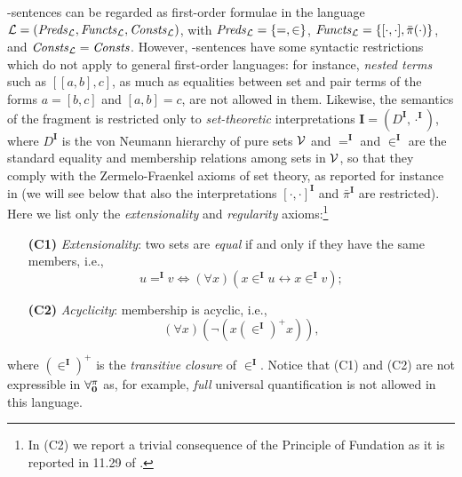 \documentclass[manyauthors]{fundam}
\newcommand{\Lang}{\ensuremath{\mathcal{L}\xspace}} %
\newcommand{\LangPreds}{\Preds_{\Lang}}
\newcommand{\LangFuncts}{\Functs_{\Lang}}
\newcommand{\LangConsts}{\Consts_{\Lang}}
\newcommand{\nonpairssym}{\bar{\pi}}
\newcommand{\nonpairs}[1]{\nonpairssym(#1)}
\newcommand{\inter}{\ensuremath{\mathbf{I}}\xspace}
\begin{document}
\Forallpizero-sentences can be regarded as first-order
formulae in the language $\Lang=(\LangPreds, \LangFuncts, \LangConsts)$, with
$\LangPreds=\{ = ,\in \}$, $\LangFuncts=\{ [\cdot, \cdot], 
\nonpairs{\cdot} \}$,
and $\LangConsts=\Consts$. However, \Forallpizero-sentences have some
syntactic restrictions which do not apply to general first-order
languages: for instance, \emph{nested terms} such as $[[a,b],c]$,
as much as equalities between set and pair terms of the forms $a=[b,c]$
and $[a,b]=c$, 
are not allowed in them. Likewise, the semantics of the fragment 
\Forallpizero is restricted only to \emph{set-theoretic} 
interpretations $\inter=(D^{\inter}, \cdot^\inter)$, where 
$D^{\inter}$ is the von Neumann hierarchy of pure sets $\mathcal{V}$ and 
$=^{\inter}$ and $\in^{\inter}$ are the standard equality and 
membership relations among sets in $\mathcal{V}$, so that they comply with 
the Zermelo-Fraenkel axioms of set theory, as reported for instance 
in \cite{Mos2005} (we will see below  that  also the interpretations 
$[\cdot,\cdot]^\inter$ and $\nonpairssym^{\inter}$ are restricted).
Here we list only the \emph{extensionality} and
\emph{regularity} axioms:\footnote{In 
(C2) we report a trivial consequence of the Principle of Fundation 
as it is reported in 11.29 of \cite{Mos2005}.}
\begin{enumerate}[leftmargin=.9cm]
  \item[\textbf{(C1)}]\label{EXT} \emph{Extensionality}: two sets are 
\emph{equal} if and only if they have the same members, i.e.,
\[
  u =^{\inter} v \iff (\forall x)(x \in^{\inter} u \leftrightarrow x 
\in^{\inter} v) ;
\]
  \item[\textbf{(C2)}]\label{REG} \emph{Acyclicity}: membership is 
acyclic, i.e.,
\[
  (\forall x)(\neg (x \mathrel{(\in^{\inter})^{+}} x)) ,
\]
\end{enumerate}
where $(\in^{\inter})^{+}$ is the \emph{transitive closure} of $\in^{\inter}$.
Notice that (C1) and (C2) are not expressible in $\mathbf{\forall_{0}^{\pi}}$
as, for example, \emph{full} universal quantification is not allowed in
this language.
%
\end{document}
